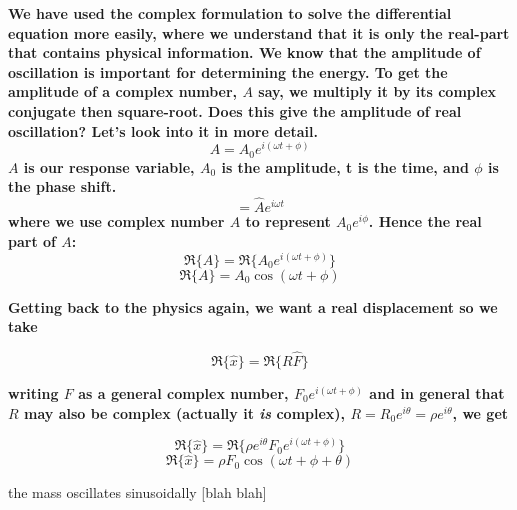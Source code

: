 \documentclass[]{revtex4}
\newcommand{\st}[1]{{\color{red}\bfseries #1}}
\begin{document}
  
  \st{We have used the complex formulation to solve the differential equation more easily, where we understand that it is only the real-part that contains
    physical information. We know that the amplitude of oscillation is important for determining the energy.  To get the amplitude of a complex number, $A$ say, we multiply it by its complex conjugate then square-root.  Does this give the amplitude of real oscillation?  Let's look into it in more detail.}
  \[A=A_0 e^{i(\omega t+\phi)}\]
  \st{
    $A$ is our response variable, $A_0$ is the amplitude, t is the time,  and $\phi$ is  the  phase  shift.
  }
  \[=\widehat{A}e^{i\omega t}\]
  \st{
    where we use complex number $\hat{A}$ to represent $A_0 e^{i\phi}$. Hence the real part of $A$:
  }
  \[\Re{\{A\}}=\Re{\{A_0 e^{i(\omega t+\phi)}\}}\]
  \[\Re{\{A\}}=A_0 \cos{(\omega t+\phi)}\]
  
  \st{Getting back to the physics again,  we want a real displacement so we take}
  
  \[\Re{\{\hat{x}\}}=\Re{\{R\widehat{F}\}}\]
  
  \st{writing $F$ as a general complex number, $F_0e^{i(\omega t + \phi)}$ and in general that $R$ may also be complex (actually it {\it is} complex),
    $R = R_0 e^{i\theta} = \rho e^{i\theta}$, we get}
  
  \[\Re{\{\hat{x}\}}=\Re{\{\rho e^{i\theta}F_0e^{i(\omega t + \phi)}\}}\]
  \[\Re{\{\hat{x}\}}=\rho F_0\cos(\omega t + \phi+\theta)\]
  
  the mass oscillates sinusoidally [blah blah]
  
\end{document}
